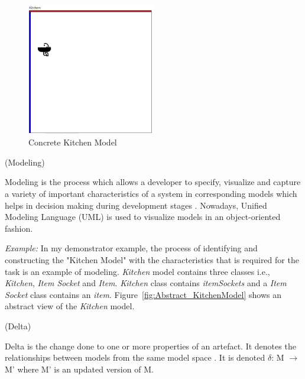 \begin{figure}
	\includegraphics[width=0.5\textwidth]{figures/Kitchen_Concrete}
	\caption{Concrete Kitchen Model}
	\label{fig:Concrete_KitchenModel}
\end{figure}

\begin{defn}\label{defModeling} (Modeling) \end{defn}
Modeling is the process which allows a developer to specify, visualize and capture a variety of important characteristics of a system in corresponding models which helps in decision making during development stages \cite{uml}. Nowadays, Unified Modeling Language (UML) \cite{uml} is used to visualize models in an object-oriented fashion.

\textit{Example:} In my demonstrator example, the process of identifying and constructing the "Kitchen Model" with the characteristics that is required for the task is an example of modeling. \textit{Kitchen} model contains three classes i.e., \textit{Kitchen}, \textit{Item Socket} and \textit{Item}. \textit{Kitchen} class contains \textit{itemSockets} and a \textit{Item Socket} class contains an \textit{item}. Figure~\ref{fig:Abstract_KitchenModel} shows an abstract view of the \textit{Kitchen} model.\\ 

\begin{defn}\label{defDelta} (Delta) \end{defn}
Delta is the change done to one or more properties of an artefact. It denotes the relationships between models from the same model space \cite{benchmarx-reload}. It is denoted $\delta$: M $\longrightarrow$ M' where M' is an updated version of M.

